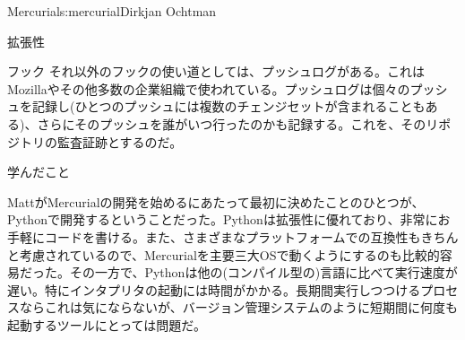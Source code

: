 \begin{aosachapter}{Mercurial}{s:mercurial}{Dirkjan Ochtman}
\begin{aosasect1}{拡張性}
\begin{aosasect2}{フック}
それ以外のフックの使い道としては、プッシュログがある。これはMozillaやその他多数の企業組織で使われている。プッシュログは個々のプッシュを記録し(ひとつのプッシュには複数のチェンジセットが含まれることもある)、さらにそのプッシュを誰がいつ行ったのかも記録する。これを、そのリポジトリの監査証跡とするのだ。

\end{aosasect2}

\end{aosasect1}

\begin{aosasect1}{学んだこと}

MattがMercurialの開発を始めるにあたって最初に決めたことのひとつが、Pythonで開発するということだった。Pythonは拡張性に優れており、非常にお手軽にコードを書ける。また、さまざまなプラットフォームでの互換性もきちんと考慮されているので、Mercurialを主要三大OSで動くようにするのも比較的容易だった。その一方で、Pythonは他の(コンパイル型の)言語に比べて実行速度が遅い。特にインタプリタの起動には時間がかかる。長期間実行しつつけるプロセスならこれは気にならないが、バージョン管理システムのように短期間に何度も起動するツールにとっては問題だ。


\end{aosasect1}
\end{aosachapter}
